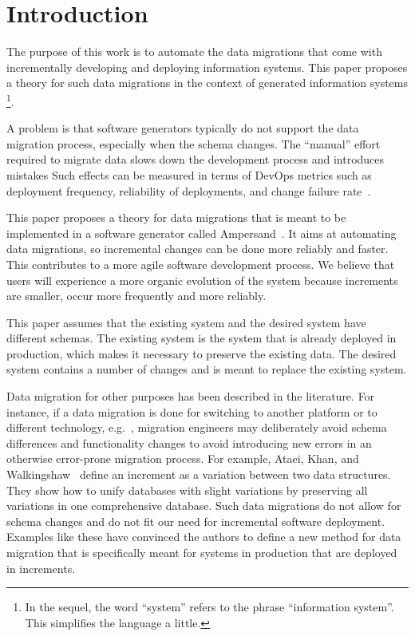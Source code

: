 \documentclass[runningheads]{llncs}
\begin{document}
\section{Introduction}
\label{sct:Introduction}
   The purpose of this work is to automate the data migrations that come with incrementally developing and deploying information systems.
   This paper proposes a theory for such data migrations in the context of generated information systems%
\footnote{In the sequel, the word ``system'' refers to the phrase ``information system''. This simplifies the language a little. }.

   A problem is that software generators typically do not support the data migration process, especially when the schema changes.
   The ``manual'' effort required to migrate data slows down the development process and introduces mistakes%
   Such effects can be measured in terms of DevOps metrics such as deployment frequency, reliability of deployments, and change failure rate~\cite{DevOps2021}.

   This paper proposes a theory for data migrations that is meant to be implemented in a software generator called Ampersand~\cite{JoostenRAMiCS2017,Joosten-JLAMP2018}.
   It aims at automating data migrations, so incremental changes can be done more reliably and faster.
   This contributes to a more agile software development process.
   We believe that users will experience a more organic evolution of the system because increments are smaller, occur more frequently and more reliably.
   
   This paper assumes that the existing system and the desired system have different schemas.
   The existing system is the system that is already deployed in production,
   which makes it necessary to preserve the existing data.
   The desired system contains a number of changes and is meant to replace the existing system.

   Data migration for other purposes has been described in the literature.
   For instance, if a data migration is done for switching to another platform or to different technology,
   e.g.~\cite{Gholami2016,Bisbal1999},
   migration engineers may deliberately avoid schema differences and functionality changes to avoid introducing new errors in an otherwise error-prone migration process.
   For example, Ataei, Khan, and Walkingshaw~\cite{Ataei2021,Walkingshaw2014} define an increment as a variation between two data structures.
   They show how to unify databases with slight variations by preserving all variations in one comprehensive database.
   Such data migrations do not allow for schema changes and do not fit our need for incremental software deployment.
   Examples like these have convinced the authors to define a new method for data migration that is specifically meant for systems in production that are
   deployed in increments.
   
\end{document}

